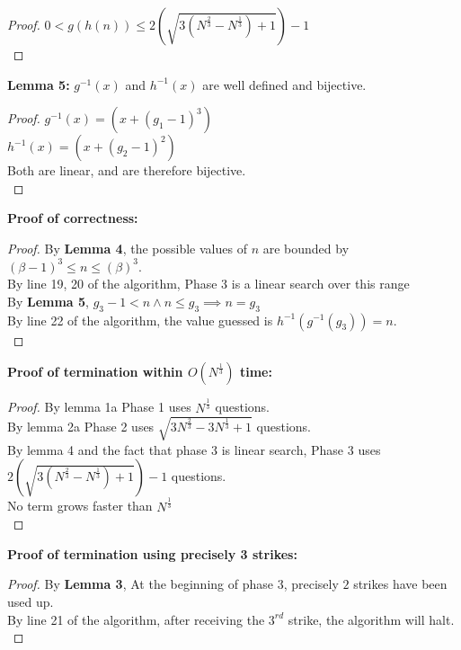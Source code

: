 \begin{problem}
\begin{proof}
    $0 < g(h(n)) \leq 2(\sqrt{3(N^{\frac{2}{3}} - N^{\frac{1}{3}}) + 1}) - 1$ \\
  \end{proof}
  \textbf{Lemma 5:} $g^{-1}(x)$ and $h^{-1}(x)$ are well defined and bijective.
  \begin{proof}
    $g^{-1}(x) = (x + (g_1 - 1)^3)$ \\
    $h^{-1}(x) = (x + (g_2 - 1)^2)$ \\
    Both are linear, and are therefore bijective. \\
  \end{proof}
  \textbf{Proof of correctness:}
  \begin{proof}
  By \textbf{Lemma 4}, the possible values of $n$ are bounded by $(\beta - 1)^3 \leq n \leq (\beta)^3$. \\
  By line 19, 20 of the algorithm, Phase 3 is a linear search over this range \\
  By \textbf{Lemma 5}, $g_3 - 1 < n \land n \leq g_3 \implies n = g_3$ \\
  By line 22 of the algorithm, the value guessed is $h^{-1}(g^{-1}(g_3)) = n$. \\
  \end{proof}
  \textbf{Proof of termination within $O(N^{\frac{1}{3}})$ time:}
  \begin{proof}
    By lemma 1a Phase 1 uses $N^{\frac{1}{3}}$ questions. \\
    By lemma 2a Phase 2 uses $\sqrt{3N^{\frac{2}{3}} - 3N^{\frac{1}{3}} + 1}$ questions. \\
    By lemma 4 and the fact that phase 3 is linear search, Phase 3 uses $2(\sqrt{3(N^{\frac{2}{3}} - N^{\frac{1}{3}}) + 1}) - 1$ questions. \\
    No term grows faster than $N^{\frac{1}{3}}$ \\
  \end{proof}
  \textbf{Proof of termination using precisely 3 strikes:}
  \begin{proof}
    By \textbf{Lemma 3}, At the beginning of phase 3, precisely $2$ strikes have been used up. \\
    By line 21 of the algorithm, after receiving the $3^{rd}$ strike, the algorithm will halt. \\
  \end{proof}
\end{problem}
